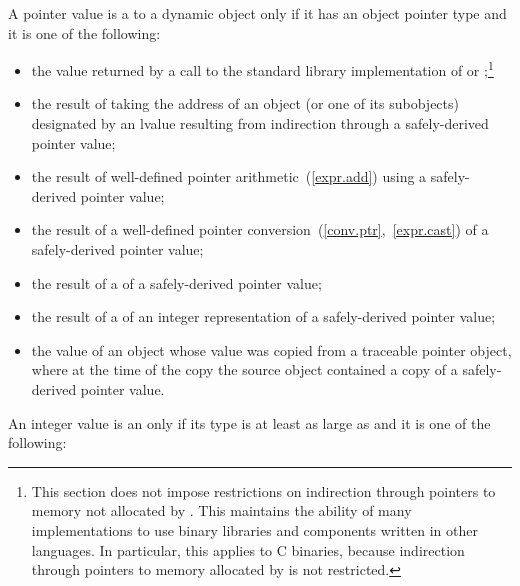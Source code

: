 \pnum
A pointer value is a  to a dynamic object only if it
has an object pointer type and it is one of the following:
\begin{itemize}
\item the value returned by a call to the \Cpp standard library implementation of
 or
%
;\footnote{This section does not impose restrictions
on indirection through pointers to memory not allocated by . This
maintains the ability of many \Cpp implementations to use binary libraries and
components written in other languages. In particular, this applies to C binaries,
because indirection through pointers to memory allocated by  is not restricted.}

\item the result of taking the address of an object (or one of its
  subobjects) designated by an lvalue resulting from indirection
  through a safely-derived pointer value;

\item the result of well-defined pointer arithmetic~(\ref{expr.add}) using a safely-derived pointer
value;

\item the result of a well-defined pointer
conversion~(\ref{conv.ptr},~\ref{expr.cast}) of a safely-derived pointer value;

\item the result of a  of a safely-derived pointer value;

\item the result of a  of an integer representation of a
safely-derived pointer value;

\item the value of an object whose value was copied from a traceable pointer object,
where at the time of the copy the source object contained a copy of a safely-derived
pointer value.
\end{itemize}

\pnum
{}%
%
An integer value is an 
only if its type is at least as large as  and it is one of the
following:

